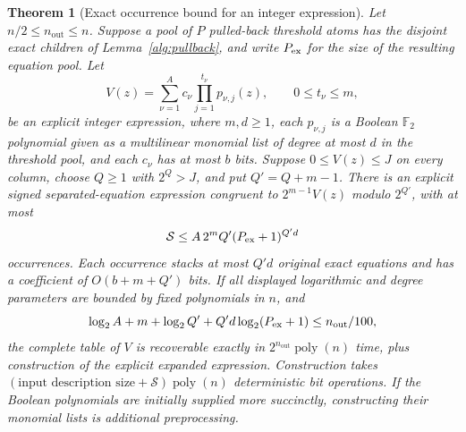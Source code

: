 \documentclass[11pt,letterpaper]{article}
\newtheorem{theorem}{Theorem}[section]
\theoremstyle{definition}
\theoremstyle{remark}
\newcommand{\poly}{\operatorname{poly}}
\begin{document}
\begin{theorem}[Exact occurrence bound for an integer expression]
\label{alg:compiler}
Let $n/2\le n_{\mathrm{out}}\le n$.  Suppose a pool of $P$ pulled-back threshold atoms
has the disjoint exact children of Lemma~\ref{alg:pullback}, and write
$P_{\rm ex}$ for the size of the resulting equation pool.  Let
\[
 V(z)=\sum_{\nu=1}^{A}c_\nu
                \prod_{j=1}^{t_\nu}p_{\nu,j}(z),
 \qquad 0\le t_\nu\le m,
\]
be an explicit integer expression, where $m,d\ge1$, each $p_{\nu,j}$
is a Boolean $\mathbb F_2$ polynomial given as a multilinear monomial list
of degree at most $d$ in the threshold pool, and each $c_\nu$ has at most
$b$ bits.  Suppose
$0\le V(z)\le J$ on every column, choose $Q\ge1$ with $2^Q>J$, and put
$Q'=Q+m-1$.  There is an explicit signed separated-equation expression
congruent to $2^{m-1}V(z)$ modulo $2^{Q'}$, with at most
\begin{equation}
 \mathcal S\le A\,2^m Q'(P_{\rm ex}+1)^{Q'd}
 \label{alg:eq-occurrences}
\end{equation}
occurrences.  Each occurrence stacks at most $Q'd$ original exact
equations and has a coefficient of $O(b+m+Q')$ bits.  If all displayed
logarithmic and degree parameters are bounded by fixed polynomials in
$n$, and
\begin{equation}
 \log_2 A+m+\log_2 Q'+Q'd\log_2(P_{\rm ex}+1)\le n_{\mathrm{out}}/100,
 \label{alg:eq-budget}
\end{equation}
the complete table of $V$ is recoverable exactly in
$2^{n_{\mathrm{out}}}\poly(n)$ time, plus construction of the explicit expanded expression.
Construction takes $(\text{input description size}+\mathcal S)\poly(n)$
deterministic bit operations.  If the Boolean
polynomials are initially supplied more succinctly, constructing their
monomial lists is additional preprocessing.
\end{theorem}
\end{document}
